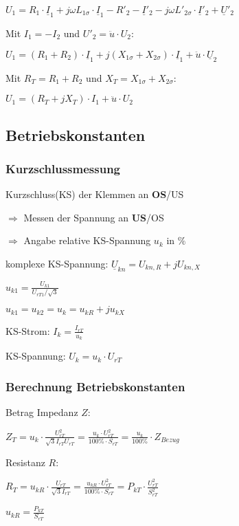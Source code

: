 	$U_{1} = R_{1} \cdot \underline{I}_{1} + j\omega L_{1\sigma} \cdot \underline{I}_{1} - R'_{2}- \underline{I}'_{2}-j\omega L'_{2\sigma} \cdot \underline{I}'_{2}+ \underline{U}'_{2}$

	Mit $I_{1} = -I_{2}$ und $U'_{2} = \ddot{u} \cdot U_2$:

	$U_{1} = (R_1 + R_2) \cdot \underline{I}_1 + j(X_{1\sigma} + X_{2\sigma}) \cdot \underline{I}_1 + \ddot{u} \cdot \underline{U}_2$

	Mit $R_T = R_1 + R_2$ und $X_T = X_{1\sigma} + X_{2\sigma}$:

	$U_1 = (R_T + jX_T) \cdot I_1 + \ddot{u} \cdot U_2$

	\subsection{Betriebskonstanten}
	\subsubsection{Kurzschlussmessung}

	Kurzschluss(KS) der Klemmen an  \textbf{OS}/US

	$\Rightarrow$ Messen der Spannung an \textbf{US}/OS

	$\Rightarrow$ Angabe relative KS-Spannung $u_{k}$ in $\%$

	komplexe KS-Spannung: $\underline{U}_{kn} = U_{kn,R} +jU_{kn,X}$

	$u_{k1} = \frac{U_{k1}}{U_{rT1}/ \sqrt{3}}$

	$u_{k1} = u_{k2} = u_{k} = u_{kR}+j u_{kX}$

	KS-Strom:
	$I_k = \frac{I_{rT}}{u_k}$

	KS-Spannung:
	$U_k = u_k \cdot U_{rT}$
	\subsubsection{Berechnung Betriebskonstanten}

	Betrag Impedanz $Z$:

	$Z_T = u_k \cdot \frac{U_{rT}^2}{\sqrt{3}I_{rT}U_{rT}} =\frac{u_k \cdot U_{rT}^2}{100 \% \cdot S_{rT}} = \frac{u_k}{100\%} \cdot Z_{Bezug}$

	Resistanz $R$:

	$R_T = u_{kR} \cdot \frac{U_{rT}}{\sqrt{3} I_{rT}} = \frac{u_{kR}\cdot U^2_{rT}}{100\% \cdot S_{rT}} = P_{kT} \cdot \frac{U_{rT}^2}{S_{rT}^2}$

	$u_{kR} = \frac{P_{kT}}{S_{rT}}$

